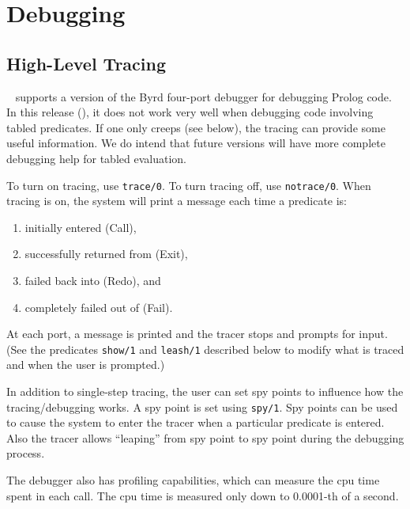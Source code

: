 \chapter{Debugging} \label{debugging}

\section{High-Level Tracing}

\ourprolog~ supports a version of the Byrd four-port debugger for debugging
Prolog code.  In this release (\version), it does not work very well
when debugging code involving tabled predicates.  If one only creeps
(see below), the tracing can provide some useful information.  We do
intend that future versions will have more complete debugging help for
tabled evaluation.

To turn on tracing, use {\tt trace/0}.  To turn tracing off, use 
{\tt notrace/0}.  When tracing is on, the system will print a message each
time a predicate is:
\begin{enumerate} 
\item initially entered (Call), 
\item successfully returned from (Exit), 
\item failed back into (Redo), and
\item completely failed out of (Fail).  
\end{enumerate}
At each port, a message is printed and the tracer stops and prompts
for input.  (See the predicates {\tt show/1} and {\tt leash/1} described
below to modify what is traced and when the user is prompted.)

In addition to single-step tracing, the user can set spy points to influence
how the tracing/debugging works.  A spy point is set using {\tt spy/1}.
Spy points can be used to cause the system to enter the tracer when
a particular predicate is entered. Also the tracer allows ``leaping'' from
spy point to spy point during the debugging process.

The debugger also has profiling capabilities, which can measure the cpu
time spent in each call. The cpu time is measured only down to 0.0001-th
of a second.

